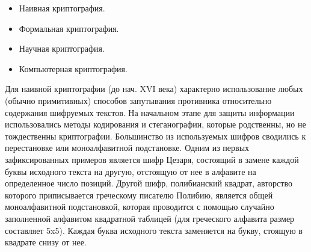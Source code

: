 \begin{itemize}
	\item Наивная криптография.
	\item Формальная криптография.
	\item Научная криптография.
	\item Компьютерная криптография.
\end{itemize}


Для наивной криптографии (до нач. XVI века) характерно использование любых (обычно примитивных) способов запутывания противника относительно содержания шифруемых текстов. На начальном этапе для защиты информации использовались методы кодирования и стеганографии, которые родственны, но не тождественны криптографии. Большинство из используемых шифров сводились к перестановке или моноалфавитной подстановке. Одним из первых зафиксированных примеров является шифр Цезаря, состоящий в замене каждой буквы исходного текста на другую, отстоящую от нее в алфавите на определенное число позиций. Другой шифр, полибианский квадрат, авторство которого приписывается греческому писателю Полибию, является общей моноалфавитной подстановкой, которая проводится с помощью случайно заполненной алфавитом квадратной таблицей (для греческого алфавита размер составляет 5x5). Каждая буква исходного текста заменяется на букву, стоящую в квадрате снизу от нее.

